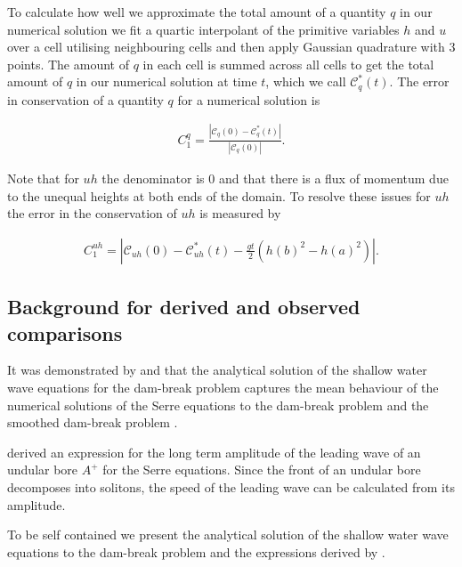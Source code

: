 \documentclass[times]{elsarticle}
\begin{document}
To calculate how well we approximate the total amount of a quantity $q$ in our numerical solution we fit a quartic interpolant of the primitive variables $h$ and $u$ over a cell utilising neighbouring cells and then apply Gaussian quadrature with 3 points. The amount of $q$ in each cell is summed across all cells to get the total amount of $q$ in our numerical solution at time $t$, which we call $\mathcal{C}^*_{q}(t)$. The error in conservation of a quantity $q$ for a numerical solution is
\begin{linenomath*}
	\begin{gather}
	C_1^q = \frac{\left| \mathcal{C}_{q}(0) - \mathcal{C}^*_{q}(t) \right| }{\left|\mathcal{C}_{q}(0)\right|}.
	\end{gather}
\end{linenomath*}
Note that for $uh$ the denominator is $0$ and that there is a flux of momentum due to the unequal heights at both ends of the domain. To resolve these issues for $uh$ the error in the conservation of $uh$ is measured by
\begin{linenomath*}
	\begin{gather}
	C_1^{uh} = \left| \mathcal{C}_{uh}(0) - \mathcal{C}^*_{uh}(t) - \frac{gt}{2}\left(h(b)^2 - h(a)^2\right)\right|  .
	\label{eq:C1def}
	\end{gather}
\end{linenomath*}


\subsection{Background for derived and observed comparisons}
It was demonstrated by \citet{Hank-etal-2010-2034} and \citet{Mitsotakis-etal-2014} that the analytical solution of the shallow water wave equations for the dam-break problem captures the mean behaviour of the numerical solutions of the Serre equations to the dam-break problem \cite{Hank-etal-2010-2034} and the smoothed dam-break problem \cite{Mitsotakis-etal-2014}. 

\citet{El-etal-2006} derived an expression for the long term amplitude of the leading wave of an undular bore $A^+$ for the Serre equations. Since the front of an undular bore decomposes into solitons, the speed of the leading wave can be calculated from its amplitude.

To be self contained we present the analytical solution of the shallow water wave equations to the dam-break problem and the expressions derived by \citet{El-etal-2006}.
\end{document}
